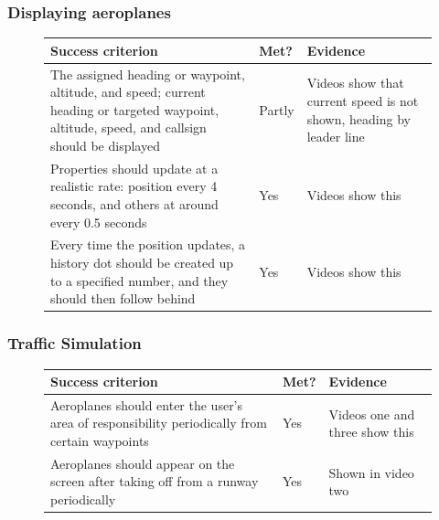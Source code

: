 \documentclass{article}
\begin{document}
\subsubsection{Displaying aeroplanes}\label{aeroplanedisplaysuccess}
\begin{figure}[H]
\centering
\begin{tabular}{| p{} | p{} | p{} |}
\hline
\textbf{Success criterion} & \textbf{Met?} & \textbf{Evidence} \\
\hline
The assigned heading or waypoint, altitude, and speed; current heading or targeted waypoint, altitude, speed, and callsign should be displayed & Partly & Videos show that current speed is not shown, heading by leader line \\
\hline
Properties should update at a realistic rate: position every 4 seconds, and others at around
every 0.5 seconds & Yes & Videos show this \\
\hline
Every time the position updates, a history dot should be created up to a specified number,
and they should then follow behind & Yes & Videos show this \\
\hline
\end{tabular}
\end{figure}

\subsubsection{Traffic Simulation}
\begin{figure}[H]
\centering
\begin{tabular}{| p{} | p{} | p{} |}
\hline
\textbf{Success criterion} & \textbf{Met?} & \textbf{Evidence} \\
\hline
Aeroplanes should enter the user's area of responsibility periodically from certain waypoints & Yes & Videos one and three show this \\
\hline
Aeroplanes should appear on the screen after taking off from a runway periodically & Yes & Shown in video two \\
\hline
\end{tabular}
\end{figure}
\end{document}
